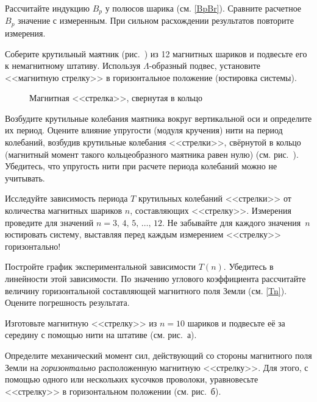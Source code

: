 \begin{lab:task}
\item Рассчитайте индукцию $B_p$ у полюсов шарика (см. \eqref{BpBr}). 
Сравните расчетное~$B_p$ значение с измеренным. 
При сильном расхождении результатов повторите измерения.


\item Соберите крутильный маятник (рис.~) из 12 магнитных шариков
и подвесьте его к немагнитному штативу.
Используя $\Lambda$-образный подвес, установите <<магнитную стрелку>>
 в горизонтальное положение (юстировка системы). 

\begin{figure}[h!]
   \centering
   \caption{Магнитная <<стрелка>>, свернутая в кольцо}       
\end{figure}

\item Возбудите крутильные колебания маятника вокруг вертикальной оси 
и определите их период. Оцените влияние упругости (модуля кручения) нити 
на период колебаний, 
возбудив крутильные колебания <<стрелки>>, свёрнутой в кольцо 
(магнитный момент такого кольцеобразного маятника равен нулю) 
(см. рис.~). Убедитесь, что упругость нити при расчете 
периода колебаний можно не учитывать.

\item Исследуйте зависимость периода $T$ крутильных колебаний <<стрелки>> 
от количества магнитных шариков $n$, составляющих <<стрелку>>. Измерения
проведите для значений  $n=3,\,4,\,5,\,\dots,\,12$. Не забывайте для каждого
значения~$n$ юстировать систему, выставляя перед каждым измерением <<стрелку>>
горизонтально!

\item Постройте график экспериментальной зависимости $T(n)$.
Убедитесь в линейности этой зависимости. 
По значению углового коэффициента рассчитайте 
величину горизонтальной составляющей магнитного поля Земли (см. \eqref{Tn}).  
Оцените погрешность результата.


\item Изготовьте магнитную <<стрелку>> из $n=10$ шариков 
и подвесьте её за середину с помощью нити на штативе (см. рис.~а).
 
\item Определите механический момент сил, действующий со стороны магнитного поля
Земли на \emph{горизонтально} расположенную магнитную <<стрелку>>. 
Для этого, с помощью одного или нескольких кусочков проволоки, 
уравновесьте <<стрелку>> в горизонтальном положении
(см. рис.~б). 


\end{lab:task}
